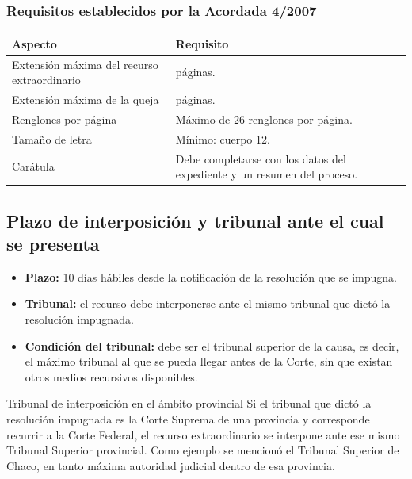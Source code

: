 \documentclass[12pt,oneside]{book}
\begin{document}
\subsubsection*{Requisitos establecidos por la Acordada 4/2007}

\begin{table}[H]
\centering
\begin{tabularx}{\textwidth}{@{}>{\raggedright\arraybackslash}p{}>{\raggedright\arraybackslash}X@{}}
\toprule
\textbf{Aspecto} & \textbf{Requisito} \\
\midrule
Extensión máxima del recurso extraordinario & 40 páginas. \\
Extensión máxima de la queja & 10 páginas. \\
Renglones por página & Máximo de 26 renglones por página. \\
Tamaño de letra & Mínimo: cuerpo 12. \\
Carátula & Debe completarse con los datos del expediente y un resumen del proceso. \\
\bottomrule
\end{tabularx}
\end{table}

\subsection{Plazo de interposición y tribunal ante el cual se presenta}

\begin{itemize}
    \item \textbf{Plazo:} 10 días hábiles desde la notificación de la resolución que se impugna.
    \item \textbf{Tribunal:} el recurso debe interponerse ante el mismo tribunal que dictó la resolución impugnada.
    \item \textbf{Condición del tribunal:} debe ser el tribunal superior de la causa, es decir, el máximo tribunal al que se pueda llegar antes de la Corte, sin que existan otros medios recursivos disponibles.
\end{itemize}

\begin{example}{Tribunal de interposición en el ámbito provincial}
Si el tribunal que dictó la resolución impugnada es la Corte Suprema de una provincia y corresponde recurrir a la Corte Federal, el recurso extraordinario se interpone ante ese mismo Tribunal Superior provincial. Como ejemplo se mencionó el Tribunal Superior de Chaco, en tanto máxima autoridad judicial dentro de esa provincia.
\end{example}
\end{document}
